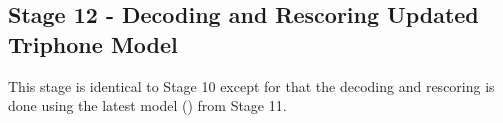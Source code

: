\subsection{ Stage 12 - Decoding and Rescoring Updated Triphone Model}
This stage is identical to Stage 10 except for that the decoding and rescoring is done using the latest model () from Stage 11.